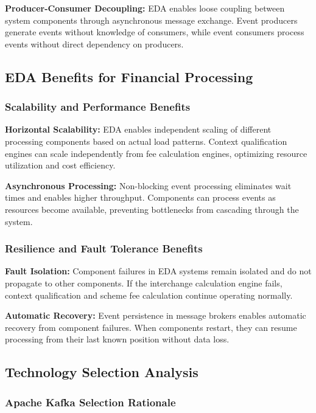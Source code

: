 \textbf{Producer-Consumer Decoupling:}
EDA enables loose coupling between system components through asynchronous message exchange. Event producers generate events without knowledge of consumers, while event consumers process events without direct dependency on producers.

\subsection{EDA Benefits for Financial Processing}

\subsubsection{Scalability and Performance Benefits}

\textbf{Horizontal Scalability:}
EDA enables independent scaling of different processing components based on actual load patterns. Context qualification engines can scale independently from fee calculation engines, optimizing resource utilization and cost efficiency.

\textbf{Asynchronous Processing:}
Non-blocking event processing eliminates wait times and enables higher throughput. Components can process events as resources become available, preventing bottlenecks from cascading through the system.

\subsubsection{Resilience and Fault Tolerance Benefits}

\textbf{Fault Isolation:}
Component failures in EDA systems remain isolated and do not propagate to other components. If the interchange calculation engine fails, context qualification and scheme fee calculation continue operating normally.

\textbf{Automatic Recovery:}
Event persistence in message brokers enables automatic recovery from component failures. When components restart, they can resume processing from their last known position without data loss.

\subsection{Technology Selection Analysis}

\subsubsection{Apache Kafka Selection Rationale}

